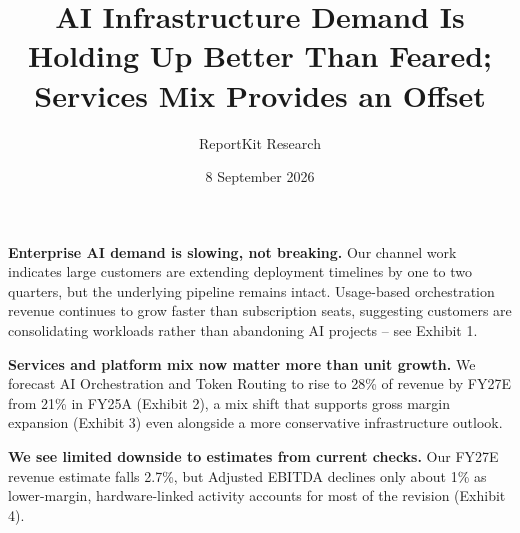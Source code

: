 \documentclass[theme=institutional-research,publication-type=equity-research]{reportkit}
\title{AI Infrastructure Demand Is Holding Up Better Than Feared; Services Mix Provides an Offset}
\author{ReportKit Research}
\date{8 September 2026}
\begin{document}
\begin{researchfrontpage}

\begin{ratingstrip}[itemcount=4]
\end{ratingstrip}

\begin{whatschanged}
\end{whatschanged}

\begin{researchmain}
\textbf{Enterprise AI demand is slowing, not breaking.} Our channel work indicates large customers are extending deployment timelines by one to two quarters, but the underlying pipeline remains intact. Usage-based orchestration revenue continues to grow faster than subscription seats, suggesting customers are consolidating workloads rather than abandoning AI projects -- see Exhibit 1.

\textbf{Services and platform mix now matter more than unit growth.} We forecast AI Orchestration and Token Routing to rise to 28\% of revenue by FY27E from 21\% in FY25A (Exhibit 2), a mix shift that supports gross margin expansion (Exhibit 3) even alongside a more conservative infrastructure outlook.

\textbf{We see limited downside to estimates from current checks.} Our FY27E revenue estimate falls 2.7\%, but Adjusted EBITDA declines only about 1\% as lower-margin, hardware-linked activity accounts for most of the revision (Exhibit 4).


\end{researchmain}
\end{researchfrontpage}
\end{document}
